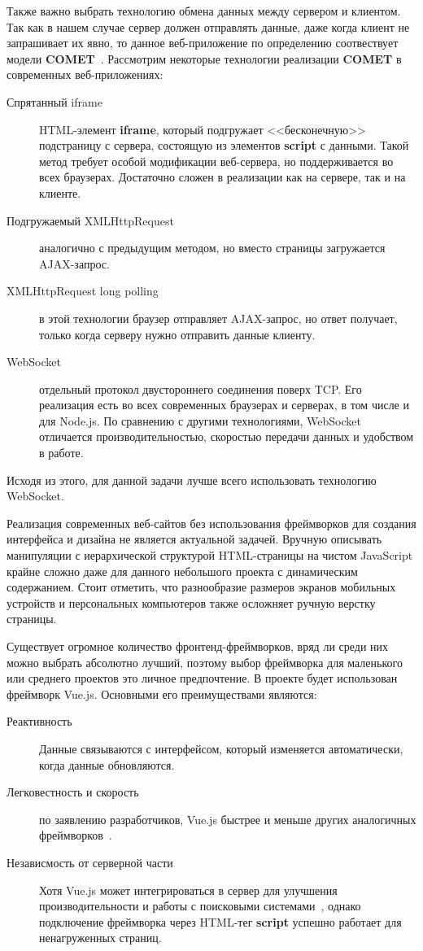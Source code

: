 Также важно выбрать технологию обмена данных между сервером и клиентом. Так как в нашем случае сервер должен отправлять данные, даже когда клиент не запрашивает их явно, то данное веб-приложение по определению соотвествует модели \textbf{COMET}~\autocite{Krill07}. Рассмотрим некоторые технологии реализации \textbf{COMET} в современных веб-приложениях:

\begin{description}
	\item[Спрятанный iframe] HTML-элемент \textbf{iframe}, который подгружает <<бесконечную>> подстраницу с сервера, состоящую из элементов \textbf{script} с данными. Такой метод требует особой модификации веб-сервера, но поддерживается во всех браузерах. Достаточно сложен в реализации как на сервере, так и на клиенте. 
	\item[Подгружаемый XMLHttpRequest] аналогично с предыдущим методом, но вместо страницы загружается AJAX-запрос.
	\item[XMLHttpRequest long polling] в этой технологии браузер отправляет AJAX-запрос, но ответ получает, только когда серверу нужно отправить данные клиенту. 
	\item[WebSocket] отдельный протокол двустороннего соединения поверх TCP. Его реализация есть во всех современных браузерах и серверах, в том числе и для Node.js. По сравнению с другими технологиями, WebSocket отличается производительностью, скоростью передачи данных и удобством в работе.
\end{description}

Исходя из этого, для данной задачи лучше всего использовать технологию WebSocket.

Реализация современных веб-сайтов без использования фреймворков для создания интерфейса и дизайна не является актуальной задачей. Вручную описывать манипуляции с иерархической структурой HTML-страницы на чистом JavaScript крайне сложно даже для данного небольшого проекта с динамическим содержанием. Стоит отметить, что разнообразие размеров экранов мобильных устройств и персональных компьютеров также осложняет ручную верстку страницы.

Существует огромное количество фронтенд-фреймворков, вряд ли среди них можно выбрать абсолютно лучший, поэтому выбор фреймворка для маленького или среднего проектов это личное предпочтение. В проекте будет использован фреймворк Vue.js. Основными его преимуществами являются:
	\begin{description}
		\item[Реактивность] Данные связываются с интерфейсом, который изменяется автоматически, когда данные обновляются.  
		\item[Легковестность и скорость] по заявлению разработчиков, Vue.js быстрее и меньше других аналогичных фреймворков~\autocite{vue}. 
		\item[Независмость от серверной части] Хотя Vue.js может интегрироваться в сервер для улучшения производительности и работы с поисковыми системами~\autocite{vue2}, однако подключение фреймворка через HTML-тег \textbf{script} успешно работает для ненагруженных страниц.  
		
	\end{description}    
 

